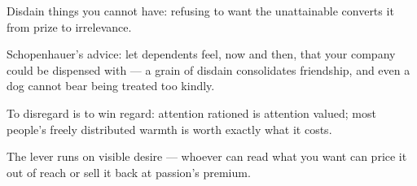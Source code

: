 

\begin{distilled}
  \item Disdain things you cannot have: refusing to want the unattainable converts it from prize to irrelevance.
  \item Schopenhauer's advice: let dependents feel, now and then, that your company could be dispensed with --- a grain of disdain consolidates friendship, and even a dog cannot bear being treated too kindly.
  \item To disregard is to win regard: attention rationed is attention valued; most people's freely distributed warmth is worth exactly what it costs.
  \item The lever runs on visible desire --- whoever can read what you want can price it out of reach or sell it back at passion's premium.
\end{distilled}
